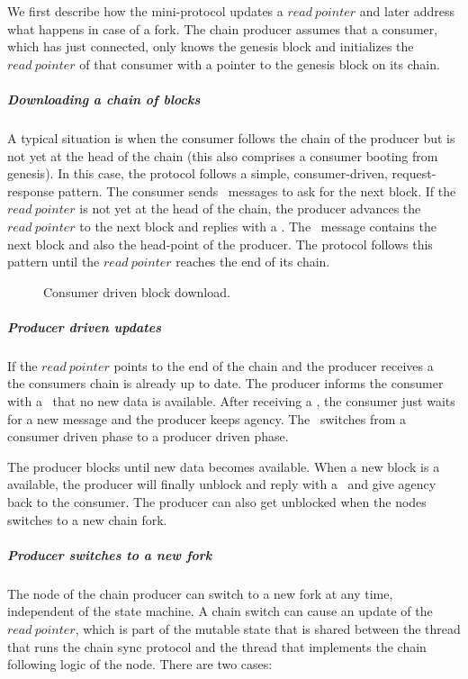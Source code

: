 \documentclass{report}
\theoremstyle{definition}{
  \newtheorem{lemma}{Lemma}[section] %
  \newtheorem{definition}[lemma]{Definition}
}
\theoremstyle{theorem}{
  \newtheorem{invariant}[lemma]{Invariant}
  \newtheorem{proofobligation}[lemma]{Proof Obligation}
}
\numberwithin{equation}{lemma}
\begin{document}
We first describe how the mini-protocol updates a $read~pointer$ and later address what happens in case
of a fork.
The chain producer assumes that a consumer, which has just connected,
only knows the genesis block and initializes the $read~pointer$ of that consumer
with a pointer to the genesis block on its chain.

\subparagraph{Downloading a chain of blocks}
A typical situation is when the consumer follows the chain of the producer but is not yet at the head of the
chain (this also comprises a consumer booting from genesis).
In this case, the protocol follows a simple, consumer-driven, request-response pattern.
The consumer sends \RequestNext~messages to ask for the next block.
If the $read~pointer$ is not yet at the head of the chain,
the producer advances the $read~pointer$ to the next block and replies with a \RollForward.
The \RollForward~message contains the next block and also the head-point of the producer.
The protocol follows this pattern until the $read~pointer$ reaches the end of its chain.

\begin{figure}[h]
\begin{center}
\end{center}
\caption{Consumer driven block download.}
\label{read-pointer-consumer-driver}
\end{figure}

\subparagraph{Producer driven updates}
If the $read~pointer$ points to the end of the chain and the producer receives a \RequestNext~
the consumers chain is already up to date.
The producer informs the consumer with a \AwaitReply~that no new data is available.
After receiving a \AwaitReply, the consumer just waits for a new message and the producer keeps agency.
The \AwaitReply~switches from a consumer driven phase to a producer driven phase.

The producer blocks until new data becomes available.
When a new block is a available, the producer will finally unblock and
reply with a \RollForward~and give agency back to the consumer.
The producer can also get unblocked when the nodes switches to a new chain fork.

\subparagraph{Producer switches to a new fork}
The node of the chain producer can switch to a new fork at any time, independent of the
state machine.
A chain switch can cause an update of the $read~pointer$,
which is part of the mutable state that is shared between the thread that runs
the chain sync protocol and the thread that implements the chain following logic of the node.
There are two cases:
\end{document}
